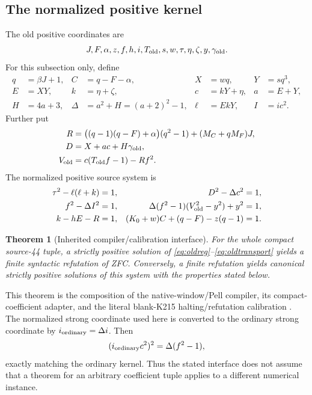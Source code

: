 \documentclass[11pt,a4paper]{article}
\newtheorem{theorem}{Theorem}[section]
\theoremstyle{definition}
\theoremstyle{remark}
\begin{document}
\subsection{The normalized positive kernel}

The old positive coordinates are
\[
 J,F,\alpha,z,f,h,i,T_{\rm old},s,w,\tau,\eta,\zeta,
 y,\gamma_{\rm old}.
\]
For this subsection only, define
\begin{align}
 q&=\beta J+1,& C&=q-F-\alpha,&
 X&=wq,& Y&=sq^3, \nonumber\\
 E&=XY,& k&=\eta+\zeta,& c&=kY+\eta,&
 a&=E+Y, \nonumber\\
 H&=4a+3,& \Delta&=a^2+H=(a+2)^2-1,&
 \ell&=EkY,& I&=ic^2.                     \label{eq:oldreg}
\end{align}
Further put
\begin{align}
 R&=\bigl((q-1)(q-F)+\alpha\bigr)(q^2-1)
                     +(M_C+qM_F)J, \label{eq:R}\\
 D&=X+ac+H\gamma_{\rm old}, \nonumber\\
 V_{\rm old}&=c(T_{\rm old}f-1)-Rf^2.       \label{eq:oldV}
\end{align}
The normalized positive source system is
\begin{align}
 \tau^2-\ell(\ell+k)&=1, &
 D^2-\Delta c^2&=1, \label{eq:oldnorms}\\
 f^2-\Delta I^2&=1, &
 \Delta(f^2-1)(V_{\rm old}^2-y^2)+y^2&=1,
                                                        \label{eq:oldaux}\\
 k-hE-R&=1, &
 (K_0+w)C+(q-F)-z(q-1)&=1.                \label{eq:oldtransport}
\end{align}

\begin{theorem}[Inherited compiler/calibration interface]
\label{thm:source}
For the whole compact source-44 tuple, a strictly positive solution of
\eqref{eq:oldreg}--\eqref{eq:oldtransport} yields a finite syntactic
refutation of ZFC. Conversely, a finite refutation yields canonical
strictly positive solutions of this system with the properties stated
below.
\end{theorem}

This theorem is the composition of the native-window/Pell compiler,
its compact-coefficient adapter, and the literal blank-K215
halting/refutation calibration \cite{source44,ordinary,pellaudit,source58}.
The normalized strong coordinate used here is converted to the ordinary
strong coordinate by \(i_{\rm ordinary}=\Delta i\). Then
\[
 (i_{\rm ordinary}c^2)^2=\Delta(f^2-1),
\]
exactly matching the ordinary kernel. Thus the stated interface does not
assume that a theorem for an arbitrary coefficient tuple applies to a
different numerical instance.
\end{document}

